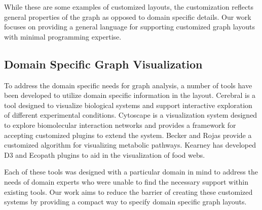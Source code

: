 While these are some examples of customized layouts, the customization reflects general properties of the graph as opposed to domain specific details. Our work focuses on providing a general language for supporting customized graph layouts with minimal programming expertise.

\subsection{Domain Specific Graph Visualization}
\smallTree
To address the domain specific needs for graph analysis, a number of tools have been developed to utilize domain specific information in the layout. Cerebral \cite{barsky2008cerebral} is a tool designed to visualize biological systems and support interactive exploration of different experimental conditions. Cytoscape \cite{shannon2003cytoscape} is a visualization system designed to explore biomolecular interaction networks and provides a framework for accepting customized plugins to extend the system. Becker and Rojas \cite{becker2001graph} provide a customized algorithm for visualizing metabolic pathways. Kearney has developed D3 \cite{kearney2017d3} and Ecopath \cite{kearney2017ecopath} plugins to aid in the visualization of food webs.

Each of these tools was designed with a particular domain in mind to address the needs of domain experts who were unable to find the necessary support within existing tools. Our work aims to reduce the barrier of creating these customized systems by providing a compact way to specify domain specific graph layouts.
